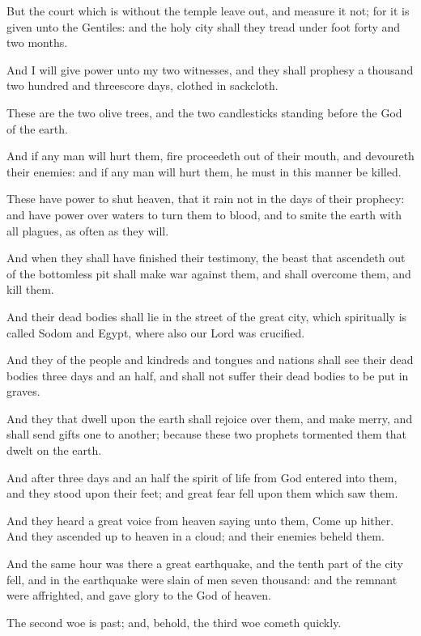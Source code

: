\verse But the court which is without the temple leave out, and measure it not; for it is given unto the Gentiles: and the holy city shall they tread under foot forty and two months.

\verse And I will give power unto my two witnesses, and they shall prophesy a thousand two hundred and threescore days, clothed in sackcloth.

\verse These are the two olive trees, and the two candlesticks standing before the God of the earth.

\verse And if any man will hurt them, fire proceedeth out of their mouth, and devoureth their enemies: and if any man will hurt them, he must in this manner be killed.

\verse These have power to shut heaven, that it rain not in the days of their prophecy: and have power over waters to turn them to blood, and to smite the earth with all plagues, as often as they will.

\verse And when they shall have finished their testimony, the beast that ascendeth out of the bottomless pit shall make war against them, and shall overcome them, and kill them.

\verse And their dead bodies shall lie in the street of the great city, which spiritually is called Sodom and Egypt, where also our Lord was crucified.

\verse And they of the people and kindreds and tongues and nations shall see their dead bodies three days and an half, and shall not suffer their dead bodies to be put in graves.

\verse And they that dwell upon the earth shall rejoice over them, and make merry, and shall send gifts one to another; because these two prophets tormented them that dwelt on the earth.

\verse And after three days and an half the spirit of life from God entered into them, and they stood upon their feet; and great fear fell upon them which saw them.

\verse And they heard a great voice from heaven saying unto them, Come up hither. And they ascended up to heaven in a cloud; and their enemies beheld them.

\verse And the same hour was there a great earthquake, and the tenth part of the city fell, and in the earthquake were slain of men seven thousand: and the remnant were affrighted, and gave glory to the God of heaven.

\verse The second woe is past; and, behold, the third woe cometh quickly.

